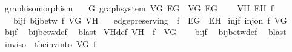 \begin{isabellebody}
{\isafoldproof}%
%
\isadelimproof
\isanewline
%
\endisadelimproof
\isanewline
{}\isamarkupfalse%
\ graph{\isacharunderscore}{\kern0pt}isomorphism\ {\isacharequal}{\kern0pt}\isanewline
\ \ G{\isacharcolon}{\kern0pt}\ graph{\isacharunderscore}{\kern0pt}system\ V\isactrlsub G\ E\isactrlsub G\ \ V\isactrlsub G\ E\isactrlsub G\ {\isacharplus}{\kern0pt}\isanewline
\ \ \ V\isactrlsub H\ E\isactrlsub H\ f\isanewline
\ \ \ bij{\isacharunderscore}{\kern0pt}f{\isacharcolon}{\kern0pt}\ {\isachardoublequoteopen}bij{\isacharunderscore}{\kern0pt}betw\ f\ V\isactrlsub G\ V\isactrlsub H{\isachardoublequoteclose}\isanewline
\ \ \ edge{\isacharunderscore}{\kern0pt}preserving{\isacharcolon}{\kern0pt}\ {\isachardoublequoteopen}{\isacharparenleft}{\kern0pt}{\isacharparenleft}{\kern0pt}{\isacharbackquote}{\kern0pt}{\isacharparenright}{\kern0pt}\ f{\isacharparenright}{\kern0pt}\ {\isacharbackquote}{\kern0pt}\ E\isactrlsub G\ {\isacharequal}{\kern0pt}\ E\isactrlsub H{\isachardoublequoteclose}\isanewline
{}\isanewline
\isanewline
{}\isamarkupfalse%
\ inj{\isacharunderscore}{\kern0pt}f{\isacharcolon}{\kern0pt}\ {\isachardoublequoteopen}inj{\isacharunderscore}{\kern0pt}on\ f\ V\isactrlsub G{\isachardoublequoteclose}\isanewline
%
\isadelimproof
\ \ %
\endisadelimproof
%
\isatagproof
{}\isamarkupfalse%
\ bij{\isacharunderscore}{\kern0pt}f\ \isamarkupfalse%
\ bij{\isacharunderscore}{\kern0pt}betw{\isacharunderscore}{\kern0pt}def\ \isamarkupfalse%
\ blast%
\endisatagproof
{\isafoldproof}%
%
\isadelimproof
\isanewline
%
\endisadelimproof
\isanewline
{}\isamarkupfalse%
\ V\isactrlsub H{\isacharunderscore}{\kern0pt}def{\isacharcolon}{\kern0pt}\ {\isachardoublequoteopen}V\isactrlsub H\ {\isacharequal}{\kern0pt}\ f\ {\isacharbackquote}{\kern0pt}\ V\isactrlsub G{\isachardoublequoteclose}\isanewline
%
\isadelimproof
\ \ %
\endisadelimproof
%
\isatagproof
{}\isamarkupfalse%
\ bij{\isacharunderscore}{\kern0pt}f\ \isamarkupfalse%
\ bij{\isacharunderscore}{\kern0pt}betw{\isacharunderscore}{\kern0pt}def\ \isamarkupfalse%
\ blast%
\endisatagproof
{\isafoldproof}%
%
\isadelimproof
\isanewline
%
\endisadelimproof
\isanewline
{}\isamarkupfalse%
\ {\isachardoublequoteopen}inv{\isacharunderscore}{\kern0pt}iso\ {\isasymequiv}\ the{\isacharunderscore}{\kern0pt}inv{\isacharunderscore}{\kern0pt}into\ V\isactrlsub G\ f{\isachardoublequoteclose}\isanewline

\end{isabellebody}
